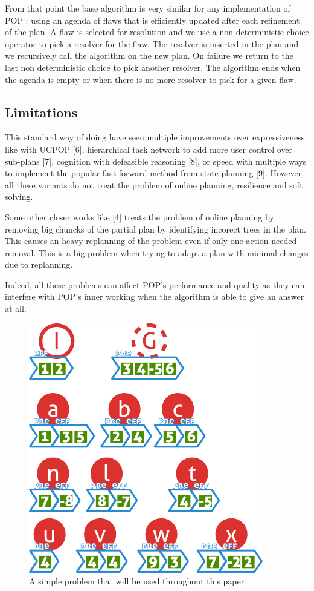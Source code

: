 \documentclass[]{article}
\begin{document}
From that point the base algorithm is very similar for any
implementation of POP : using an agenda of flaws that is efficiently
updated after each refinement of the plan. A flaw is selected for
resolution and we use a non deterministic choice operator to pick a
resolver for the flaw. The resolver is inserted in the plan and we
recursively call the algorithm on the new plan. On failure we return to
the last non deterministic choice to pick another resolver. The
algorithm ends when the agenda is empty or when there is no more
resolver to pick for a given flaw.

\subsection{Limitations}\label{limitations}

This standard way of doing have seen multiple improvements over
expressiveness like with UCPOP {[}6{]}, hierarchical task network to add
more user control over sub-plans {[}7{]}, cognition with defeasible
reasoning {[}8{]}, or speed with multiple ways to implement the popular
fast forward method from state planning {[}9{]}. However, all these
variants do not treat the problem of online planning, resilience and
soft solving.

Some other closer works like {[}4{]} treats the problem of online
planning by removing big chuncks of the partial plan by identifying
incorect trees in the plan. This causes an heavy replanning of the
problem even if only one action needed removal. This is a big problem
when trying to adapt a plan with minimal changes due to replanning.

Indeed, all these problems can affect POP's performance and quality as
they can interfere with POP's inner working when the algorithm is able
to give an answer at all.

\begin{figure}[htbp]
\centering
\includegraphics{graphics/problem.pdf}
\caption{A simple problem that will be used throughout this
paper\label{fig:problem}}
\end{figure}
\end{document}
